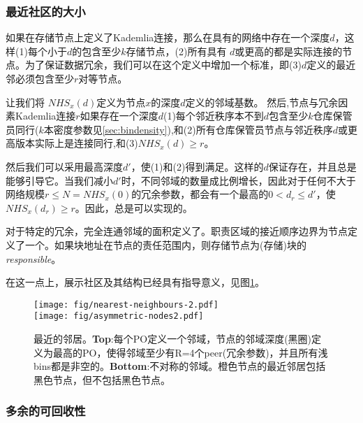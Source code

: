 \subsubsection{最近社区的大小}

如果在存储节点上定义了Kademlia连接，那么在具有的网络中存在一个深度$d$，这样(1)每个小于$d$的包含至少$k$存储节点，(2)所有具有 $d$或更高的都是实际连接的节点。为了保证数据冗余，我们可以在这个定义中增加一个标准，即(3)$d$定义的最近邻必须包含至少$r$对等节点。

让我们将 $\mathit{NHS}_x(d)$定义为节点$x$的深度$d$定义的邻域基数。
然后,节点与冗余因素Kademlia连接$r$如果存在一个深度$d$(1)每个邻近秩序本不到$d$包含至少$k$仓库保管员同行($k$本密度参数见\ref{sec:bindensity}),和(2)所有仓库保管员节点与邻近秩序$d$或更高版本实际上是连接同行,和(3)$\mathit{NHS}_x(d)\geq r$。

然后我们可以采用最高深度$d'$，使(1)和(2)得到满足。这样的$d$保证存在，并且总是能够引导它。当我们减小$d'$时，不同邻域的数量成比例增长，因此对于任何不大于网络规模$r\leq N=\mathit{NHS}_x(0)$的冗余参数，都会有一个最高的$0<d_r\leq d'$，使$\mathit{NHS}_x(d_r)\geq r$。因此，总是可以实现的。



对于特定的冗余，完全连通邻域的面积定义了。职责区域的接近顺序边界为节点定义了一个。如果块地址在节点的责任范围内，则存储节点为(存储)块的\emph{responsible}。

在这一点上，展示社区及其结构已经具有指导意义，见图\ref{fig:nearest-neighbours}。 

\begin{figure}[htbp]
   \centering
   \texttt{[image: fig/nearest-neighbours-2.pdf]} \\\texttt{[image: fig/asymmetric-nodes2.pdf]}
   \caption[最近的邻居\statusgreen]{最近的邻居。\textbf{Top}:每个PO定义一个邻域，节点的邻域深度(黑圈)定义为最高的PO，使得邻域至少有R=4个peer(冗余参数)，并且所有浅bins都是非空的。\textbf{Bottom}:不对称的邻域。橙色节点的最近邻居包括黑色节点，但不包括黑色节点。}
   \label{fig:nearest-neighbours}
\end{figure}


\subsubsection{多余的可回收性}

